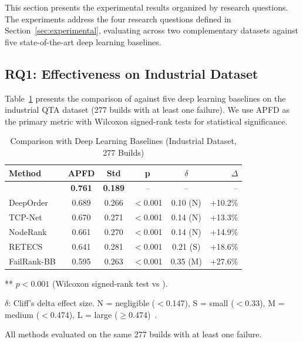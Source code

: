 

This section presents the experimental results organized by research questions.
The experiments address the four research questions defined in
Section~\ref{sec:experimental}, evaluating \filopriori{} across two
complementary datasets against five state-of-the-art deep learning baselines.


\subsection{RQ1: Effectiveness on Industrial Dataset}
\label{sec:rq1}

Table~\ref{tab:tcp_comparison} presents the comparison of \filopriori{} against
five deep learning baselines on the industrial QTA dataset (277 builds with at
least one failure). We use APFD as the primary metric with Wilcoxon signed-rank
tests for statistical significance.

\begin{table}[!t]
\centering
\caption{Comparison with Deep Learning Baselines (Industrial Dataset, 277 Builds)}
\label{tab:tcp_comparison}
\scriptsize
\begin{tabular}{lccccr}
\toprule
\textbf{Method} & \textbf{APFD} & \textbf{Std} & \textbf{p} & \textbf{$\delta$} & \textbf{$\Delta$} \\
\midrule
\textbf{\filopriori{}} & \textbf{0.761} & \textbf{0.189} & -- & -- & -- \\
DeepOrder~\cite{chen2023deeporder} & 0.689 & 0.266 & $<$0.001 & 0.10 (N) & +10.2\% \\
TCP-Net~\cite{abdelkarim2022tcp} & 0.670 & 0.271 & $<$0.001 & 0.14 (N) & +13.3\% \\
NodeRank~\cite{li2024noderank} & 0.661 & 0.270 & $<$0.001 & 0.14 (N) & +14.9\% \\
RETECS~\cite{spieker2017reinforcement} & 0.641 & 0.281 & $<$0.001 & 0.21 (S) & +18.6\% \\
FailRank-BB~\cite{hernandes2025method} & 0.595 & 0.263 & $<$0.001 & 0.35 (M) & +27.6\% \\
\bottomrule
\end{tabular}
\begin{tablenotes}
\small
\item *** $p < 0.001$ (Wilcoxon signed-rank test vs \filopriori{}).
\item $\delta$: Cliff's delta effect size. N = negligible ($<$0.147), S = small ($<$0.33),
M = medium ($<$0.474), L = large ($\geq$0.474)~\cite{arcuri2011practical}.
\item All methods evaluated on the same 277 builds with at least one failure.
\end{tablenotes}
\end{table}

